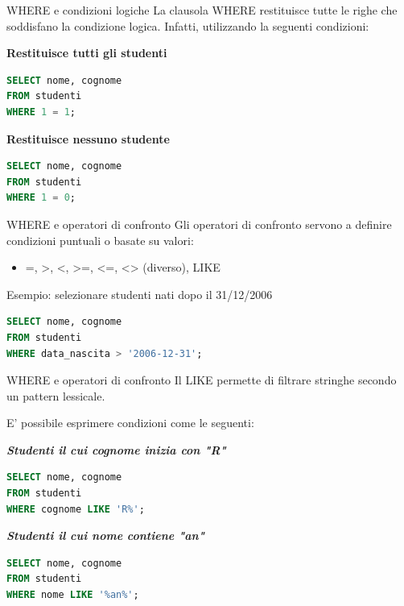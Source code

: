 \documentclass{beamer}
\begin{document}
\begin{frame}[fragile]{WHERE e condizioni logiche}
La clausola WHERE restituisce tutte le righe che soddisfano la condizione logica. 
Infatti, utilizzando la seguenti condizioni:
\bigskip

\textbf{Restituisce tutti gli studenti}
\begin{lstlisting}[language=SQL]
SELECT nome, cognome
FROM studenti
WHERE 1 = 1;
\end{lstlisting}

\bigskip
\textbf{Restituisce nessuno studente}
\begin{lstlisting}[language=SQL]
SELECT nome, cognome
FROM studenti
WHERE 1 = 0;
\end{lstlisting}

\end{frame}

\begin{frame}[fragile]{WHERE e operatori di confronto}
Gli operatori di confronto servono a definire condizioni puntuali o basate su valori:

\begin{itemize}
    \item =,  >, <, >=, <=, <> (diverso), LIKE
\end{itemize}

\medskip
Esempio: selezionare studenti nati dopo il 31/12/2006

\begin{lstlisting}[language=SQL]
SELECT nome, cognome
FROM studenti
WHERE data_nascita > '2006-12-31';
\end{lstlisting}
\end{frame}


\begin{frame}[fragile]{WHERE e operatori di confronto}
Il LIKE permette di filtrare stringhe secondo un pattern lessicale.

\medskip 

E' possibile esprimere condizioni come le seguenti:

\bigskip
\textbf{\textit{Studenti il cui cognome inizia con "R"}}
\begin{lstlisting}[language=SQL]
SELECT nome, cognome
FROM studenti
WHERE cognome LIKE 'R%';
\end{lstlisting}

\bigskip
\textbf{\textit{Studenti il cui nome contiene "an"}}
\begin{lstlisting}[language=SQL]
SELECT nome, cognome
FROM studenti
WHERE nome LIKE '%an%';
\end{lstlisting}

\end{frame}
\end{document}
